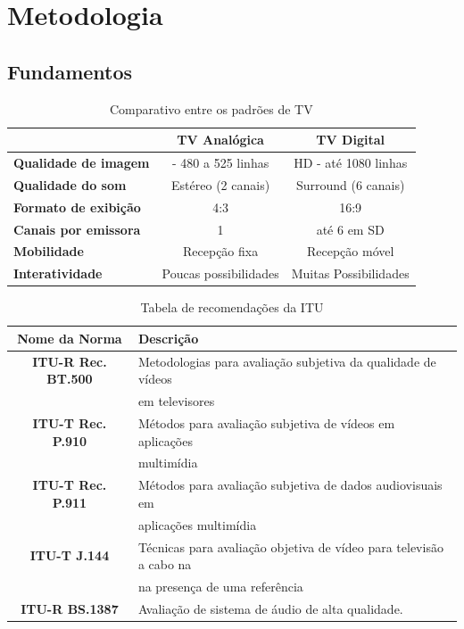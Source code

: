 \chapter{Metodologia}

\section{Fundamentos}

\begin{table}[!htb]
	\centering
	\caption{Comparativo entre os padrões de TV}
	\begin{tabular}{lcc}
		\hline
		& \textbf{TV Analógica} & \textbf{TV Digital} \\
		\hline
		\textbf{Qualidade de imagem} & \sigla{SD}{Standard Definition} - 480 a 525 linhas & HD - até 1080 linhas \\
		\textbf{Qualidade do som} & Estéreo (2 canais) & Surround (6 canais) \\
		\textbf{Formato de exibição} & 4:3 & 16:9 \\
		\textbf{Canais por emissora} & 1 & até 6 em SD \\
		\textbf{Mobilidade} & Recepção fixa & Recepção móvel \\
		\textbf{Interatividade} & Poucas possibilidades & Muitas Possibilidades \\
		\hline
	\end{tabular}
\end{table}

\begin{table}
	\centering
	\caption{Tabela de recomendações da ITU}
	\begin{tabular}{c|l}
		\hline
		\textbf{Nome da Norma} & Descrição \\
		\hline
		\textbf{ITU-R Rec. BT.500} & Metodologias para avaliação subjetiva da qualidade de vídeos \\
			& em televisores \\
		\textbf{ITU-T Rec. P.910} & Métodos para avaliação subjetiva de vídeos em aplicações \\
			& multimídia \\
		\textbf{ITU-T Rec. P.911} & Métodos para avaliação subjetiva de dados audiovisuais em \\
			& aplicações multimídia \\
		\textbf{ITU-T J.144} & Técnicas para avaliação objetiva de vídeo para televisão a cabo na \\
			& na presença de uma referência \\
		\textbf{ITU-R BS.1387} & Avaliação de sistema de áudio de alta qualidade. \\
		\hline
	\end{tabular}
\end{table}

